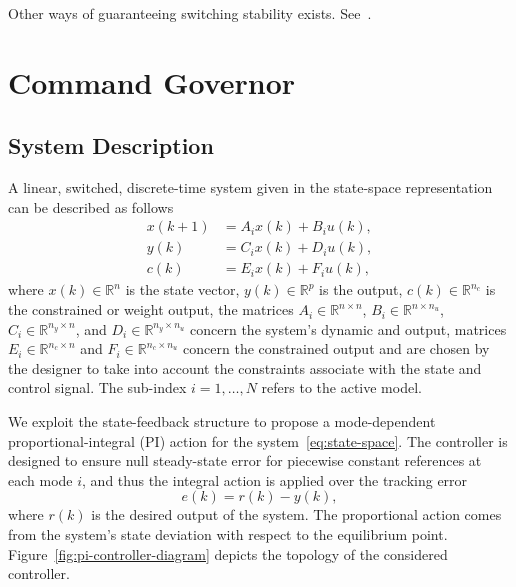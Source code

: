 Other ways of guaranteeing switching stability exists.
See~\textcite{geromel.deaecto:stability,liberzon.morse:basic,geromel.colaneri:stabilization}.

\section{Command Governor}%
\label{sec:command-governor}

\subsection{System Description}%
\label{subsec:system-description}

A linear, switched, discrete-time system given in the state-space representation can be described as follows
%
\begin{equation}
  \label{eq:state-space}
  \begin{aligned}
    x(k+1) & = A_{i}x(k)+B_{i}u(k), \\
    y(k)   & = C_{i}x(k)+D_{i}u(k), \\
    c(k)   & = E_{i}x(k)+F_{i}u(k),
  \end{aligned}
\end{equation}
%
where \(x(k)\in\mathbb{R}^n\) is the state vector, \(y(k)\in\mathbb{R}^p\) is the
output, \(c(k)\in\mathbb{R}^{n_c}\) is the constrained or weight output, the
matrices \(A_{i}\in\mathbb{R}^{n\times{}n}\), \(B_{i}\in\mathbb{R}^{n\times{}n_u}\),
\(C_{i}\in\mathbb{R}^{n_y\times{}n}\), and \(D_{i}\in\mathbb{R}^{n_y\times{}n_u}\) concern the
system's dynamic and output, matrices \(E_{i}\in\mathbb{R}^{n_c\times{}n}\) and
\(F_{i}\in\mathbb{R}^{n_c\times{}n_u}\) concern the constrained output and are chosen
by the designer to take into account the constraints associate with the state
and control signal. The sub-index \(i = 1,\ldots,N\) refers to the active model.

We exploit the state-feedback structure to propose a mode-dependent
proportional-integral (PI) action for the system~\eqref{eq:state-space}. The
controller is designed to ensure null steady-state error for piecewise constant
references at each mode \(i\), and thus the integral action is applied over the
tracking error~\parencite{lopes.leite.ea:anti-windup}
%
\begin{equation}
  \label{eq:r-y-error}
  e(k) = r(k)-y(k),
\end{equation}
%
where \(r(k)\) is the desired output of the system. The proportional action
comes from the system's state deviation with respect to the equilibrium point.
Figure~\ref{fig:pi-controller-diagram} depicts the topology of the considered
controller.

